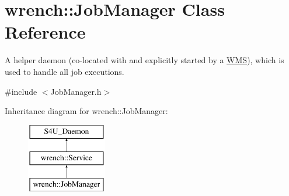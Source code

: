 \hypertarget{classwrench_1_1_job_manager}{}\section{wrench\+:\+:Job\+Manager Class Reference}
\label{classwrench_1_1_job_manager}


A helper daemon (co-\/located with and explicitly started by a \hyperlink{classwrench_1_1_w_m_s}{W\+MS}), which is used to handle all job executions.  




{\ttfamily \#include $<$Job\+Manager.\+h$>$}

Inheritance diagram for wrench\+:\+:Job\+Manager\+:\begin{figure}[H]
\begin{center}
\leavevmode
\includegraphics[height=3.000000cm]{classwrench_1_1_job_manager}
\end{center}
\end{figure}
